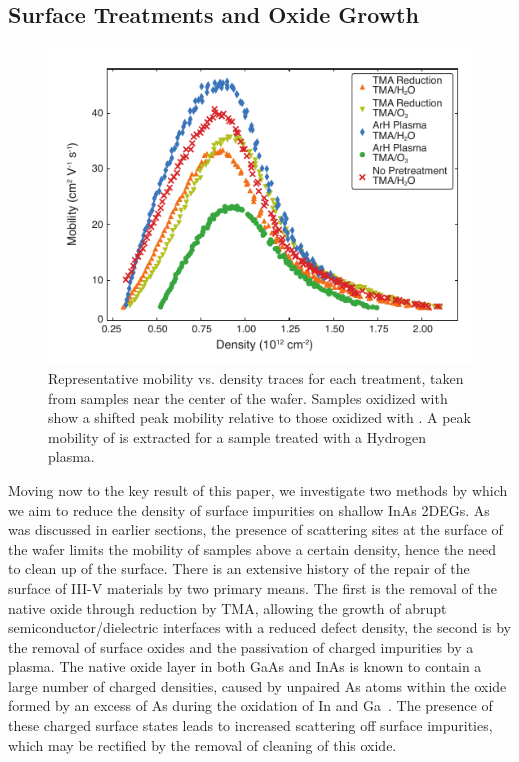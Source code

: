 \subsection{\label{sec:surf_treat}Surface Treatments and Oxide Growth}

\begin{figure}
    \includegraphics[width=0.6\linewidth]{Figure2}
    \caption{\label{fig:surf_fig2} Representative mobility vs. density traces for each treatment, taken from samples near the center of the wafer. Samples oxidized with  show a shifted peak mobility relative to those oxidized with . A peak mobility of  is extracted for a sample treated with a Hydrogen plasma.}
\end{figure}

Moving now to the key result of this paper, we investigate two methods by which we aim to reduce the density of surface impurities on shallow InAs 2DEGs. As was discussed in earlier sections, the presence of scattering sites at the surface of the wafer limits the mobility of samples above a certain density, hence the need to clean up of the surface. There is an extensive history of the repair of the surface of III-V materials by two primary means. The first is the removal of the native oxide through reduction by TMA, allowing the growth of abrupt semiconductor/dielectric interfaces with a reduced defect density\cite{doi:10.1063/1.3148723,Tallarida_2012,CLEVELAND2013167}, the second is by the removal of surface oxides and the passivation of charged impurities by a  plasma\cite{CLEVELAND2013167,BELL1998125,doi:10.1116/1.586538}. The native oxide layer in both GaAs and InAs is known to contain a large number of charged densities\cite{doi:10.1063/1.5054292,PhysRevB.49.11159}, caused by unpaired As atoms within the oxide formed by an excess of As during the oxidation of In and Ga~\cite{doi:10.1063/1.3369540,Affentauschegg_2001}. The presence of these charged surface states leads to increased scattering off surface impurities, which may be rectified by the removal of cleaning of this oxide.

